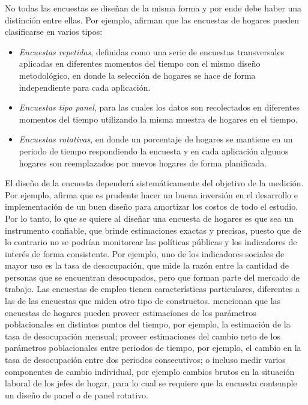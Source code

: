 \documentclass[
  12pt,
]{book}
\providecommand{\tightlist}{%
  \setlength{\itemsep}{0pt}\setlength{\parskip}{0pt}}
\begin{document}
No todas las encuestas se diseñan de la misma forma y por ende debe haber una distinción entre ellas. Por ejemplo, \citet{Kalton_Citro_1993} afirman que las encuestas de hogares pueden clasificarse en varios tipos:

\begin{itemize}
\tightlist
\item
  \emph{Encuestas repetidas}, definidas como una serie de encuestas transversales aplicadas en diferentes momentos del tiempo con el mismo diseño metodológico, en donde la selección de hogares se hace de forma independiente para cada aplicación.
\item
  \emph{Encuestas tipo panel}, para las cuales los datos son recolectados en diferentes momentos del tiempo utilizando la misma muestra de hogares en el tiempo.
\item
  \emph{Encuestas rotativas}, en donde un porcentaje de hogares se mantiene en un periodo de tiempo respondiendo la encuesta y en cada aplicación algunos hogares son reemplazados por nuevos hogares de forma planificada.
\end{itemize}

El diseño de la encuesta dependerá sistemáticamente del objetivo de la medición. Por ejemplo, \citet{Kalton_2009} afirma que es prudente hacer un buena inversión en el desarrollo e implementación de un buen diseño para amortizar los costos de todo el estudio. Por lo tanto, lo que se quiere al diseñar una encuesta de hogares es que sea un instrumento confiable, que brinde estimaciones exactas y precisas, puesto que de lo contrario no se podrían monitorear las políticas públicas y los indicadores de interés de forma consistente. Por ejemplo, uno de los indicadores sociales de mayor uso es la tasa de desocupación, que mide la razón entre la cantidad de personas que se encuentran desocupados, pero que forman parte del mercado de trabajo. Las encuestas de empleo tienen características particulares, diferentes a las de las encuestas que miden otro tipo de constructos. \citet{Duncan_Kalton_1987} mencionan que las encuestas de hogares pueden proveer estimaciones de los parámetros poblacionales en distintos puntos del tiempo, por ejemplo, la estimación de la tasa de desocupación mensual; proveer estimaciones del cambio neto de los parámetros poblacionales entre periodos de tiempo, por ejemplo, el cambio en la tasa de desocupación entre dos periodos consecutivos; o incluso medir varios componentes de cambio individual, por ejemplo cambios brutos en la situación laboral de los jefes de hogar, para lo cual se requiere que la encuesta contemple un diseño de panel o de panel rotativo.
\end{document}
